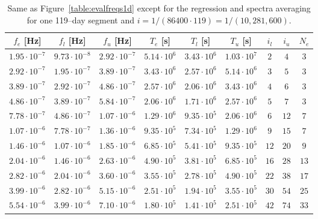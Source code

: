 \documentclass[draft,linenumbers]{agujournal2018}
\begin{document}
\begin{table}
  \caption{Same as Figure~\ref{table:evalfreqs1d} except for the regression and spectra averaging for one 119--day segment and $i=1/(86400\cdot 119)=1/(10,281,600)$.}
  \centering
  \small
\begin{tabular}{c c c c c c c c c}
\hline
$f_e$ [Hz] & $f_l$ [Hz] & $f_u$ [Hz] & $T_e$ [s] & $T_l$ [s] & $T_u$ [s] & $i_l$ & $i_u$ & $N_e$ \\
\hline
$1.95\cdot 10^{-7}$ & $9.73\cdot 10^{-8}$ & $2.92\cdot 10^{-7}$ & $5.14\cdot 10^{6}$ & $3.43\cdot 10^{6}$ & $1.03\cdot 10^{7}$ & $         2$ & $         4$ & $      3$\\
$2.92\cdot 10^{-7}$ & $1.95\cdot 10^{-7}$ & $3.89\cdot 10^{-7}$ & $3.43\cdot 10^{6}$ & $2.57\cdot 10^{6}$ & $5.14\cdot 10^{6}$ & $         3$ & $         5$ & $      3$\\
$3.89\cdot 10^{-7}$ & $2.92\cdot 10^{-7}$ & $4.86\cdot 10^{-7}$ & $2.57\cdot 10^{6}$ & $2.06\cdot 10^{6}$ & $3.43\cdot 10^{6}$ & $         4$ & $         6$ & $      3$\\
$4.86\cdot 10^{-7}$ & $3.89\cdot 10^{-7}$ & $5.84\cdot 10^{-7}$ & $2.06\cdot 10^{6}$ & $1.71\cdot 10^{6}$ & $2.57\cdot 10^{6}$ & $         5$ & $         7$ & $      3$\\
$7.78\cdot 10^{-7}$ & $4.86\cdot 10^{-7}$ & $1.07\cdot 10^{-6}$ & $1.29\cdot 10^{6}$ & $9.35\cdot 10^{5}$ & $2.06\cdot 10^{6}$ & $         6$ & $        12$ & $      7$\\
$1.07\cdot 10^{-6}$ & $7.78\cdot 10^{-7}$ & $1.36\cdot 10^{-6}$ & $9.35\cdot 10^{5}$ & $7.34\cdot 10^{5}$ & $1.29\cdot 10^{6}$ & $         9$ & $        15$ & $      7$\\
$1.46\cdot 10^{-6}$ & $1.07\cdot 10^{-6}$ & $1.85\cdot 10^{-6}$ & $6.85\cdot 10^{5}$ & $5.41\cdot 10^{5}$ & $9.35\cdot 10^{5}$ & $        12$ & $        20$ & $      9$\\
$2.04\cdot 10^{-6}$ & $1.46\cdot 10^{-6}$ & $2.63\cdot 10^{-6}$ & $4.90\cdot 10^{5}$ & $3.81\cdot 10^{5}$ & $6.85\cdot 10^{5}$ & $        16$ & $        28$ & $     13$\\
$2.82\cdot 10^{-6}$ & $2.04\cdot 10^{-6}$ & $3.60\cdot 10^{-6}$ & $3.55\cdot 10^{5}$ & $2.78\cdot 10^{5}$ & $4.90\cdot 10^{5}$ & $        22$ & $        38$ & $     17$\\
$3.99\cdot 10^{-6}$ & $2.82\cdot 10^{-6}$ & $5.15\cdot 10^{-6}$ & $2.51\cdot 10^{5}$ & $1.94\cdot 10^{5}$ & $3.55\cdot 10^{5}$ & $        30$ & $        54$ & $     25$\\
$5.54\cdot 10^{-6}$ & $3.99\cdot 10^{-6}$ & $7.10\cdot 10^{-6}$ & $1.80\cdot 10^{5}$ & $1.41\cdot 10^{5}$ & $2.51\cdot 10^{5}$ & $        42$ & $        74$ & $     33$\\

\end{tabular}
\end{table}
\end{document}
